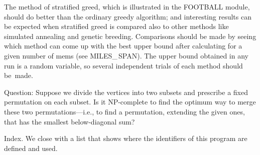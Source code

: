 The method of stratified greed, which is illustrated in the {\sc
FOOTBALL} module, should do better than the ordinary greedy algorithm;
and interesting results can be expected when stratified greed is compared
also to other methods like simulated annealing and genetic breeding.
Comparisons should be made by seeing which method can come up with the
best upper bound after calculating for a given number of mems (see
{\sc MILES\_\,SPAN}). The upper bound obtained in any run is a random
variable, so several independent trials of each method should be~made.

Question: Suppose we divide the vertices into two subsets and prescribe
a fixed permutation on each subset. Is it NP-complete to find the
optimum way to merge these two permutations---i.e., to find a
permutation, extending the given ones, that has the smallest
below-diagonal sum?

\fi

Index. We close with a list that shows where the identifiers of this
program are defined and used.

\fi


\inx
\fin
\con
